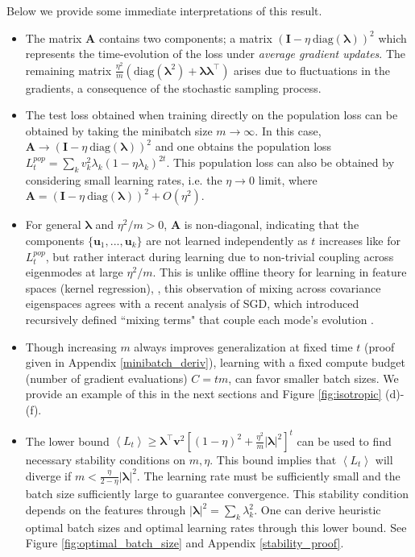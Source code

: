 \documentclass{article} %
\def\A{\mathbf A}
\def\u{\mathbf u}
\def\I{\mathbf I}
\begin{document}
Below we provide some immediate interpretations of this result.
\begin{itemize}[leftmargin=*]
    \item The matrix $\A$ contains two components; a matrix $\left( \I - \eta \ \text{diag}(\bm\lambda) \right)^2$ which represents the time-evolution of the loss under \textit{average gradient updates}. The remaining matrix $\frac{\eta^2}{m} \left( \text{diag}(\bm\lambda^2) + \bm\lambda \bm\lambda^\top \right)$ arises due to fluctuations in the gradients, a consequence of the stochastic sampling process. 
    \item The test loss obtained when training directly on the population loss can be obtained by taking the minibatch size $m \to \infty$. In this case, $\A \to (\I - \eta \  \text{diag}(\bm\lambda))^2$ and one obtains the population loss $L_t^{pop} = \sum_k v_k^2 \lambda_k (1-\eta\lambda_k)^{2t}$. This population loss can also be obtained by considering small learning rates, i.e. the $\eta \to 0$ limit, where $\A = (\I - \eta \ \text{diag}(\bm\lambda))^2 + O(\eta^2)$. 
    \item For general $\bm\lambda$ and $\eta^2 / m > 0$, $\A$ is non-diagonal, indicating that the components $\{\u_1,...,\u_k\}$ are not learned independently as $t$ increases like for $L^{pop}_t$, but rather interact during learning due to non-trivial coupling across eigenmodes at large $\eta^2/m$. This is unlike offline theory for learning in feature spaces (kernel regression), \citep{bordelon2020spectrum, Canatar2020SpectralBA}, this observation of mixing across covariance eigenspaces agrees with a recent analysis of SGD, which introduced recursively defined ``mixing terms" that couple each mode's evolution \citep{varre2021iterate}. 
    \item Though increasing $m$ always improves generalization at fixed time $t$ (proof given in Appendix \ref{minibatch_deriv}), learning with a fixed compute budget (number of gradient evaluations) $C = t m$, can favor smaller batch sizes. We provide an example of this in the next sections and Figure \ref{fig:isotropic} (d)-(f).
    \item The lower bound $\left< L_t\right> \geq \bm\lambda^\top \bm v^2 \left[ (1-\eta)^2 + \frac{\eta^2}{m} |\bm\lambda|^2 \right]^t$ can be used to find necessary stability conditions on $m,\eta$. This bound implies that $\left<L_t\right>$ will diverge if $m < \frac{\eta }{2-\eta} |\bm\lambda|^2$. The learning rate must be sufficiently small and the batch size sufficiently large to guarantee convergence. This stability condition depends on the features through $|\bm\lambda|^2 = \sum_k \lambda_k^2$. One can derive heuristic optimal batch sizes and optimal learning rates through this lower bound. See Figure \ref{fig:optimal_batch_size} and Appendix \ref{stability_proof}.
\end{itemize}
\end{document}
